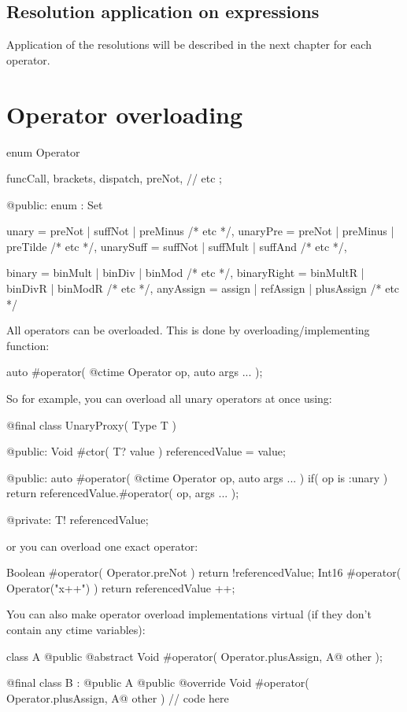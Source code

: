 \subsection{Resolution application on expressions}
Application of the resolutions will be described in the next chapter for each operator.

\section{Operator overloading}
\begin{code}
enum Operator {
	funcCall,
	brackets,
	dispatch,
	preNot,
	// etc
	;
	
@public:
	enum : Set {
		unary = preNot | suffNot | preMinus /* etc */,
		unaryPre = preNot | preMinus | preTilde /* etc */,
		unarySuff = suffNot | suffMult | suffAnd /* etc */,
		
		binary = binMult | binDiv | binMod /* etc */,
		binaryRight = binMultR | binDivR | binModR /* etc */,
		anyAssign = assign | refAssign | plusAssign /* etc */
	}	
}
\end{code}

All operators can be overloaded. This is done by overloading/implementing function:
\begin{code}
auto #operator( @ctime Operator op, auto args ... );
\end{code}

So for example, you can overload all unary operators at once using:
\begin{code}
@final class UnaryProxy( Type T ) {
	
@public:
	Void #ctor( T? value ) {
		referencedValue = value;
	}
	
@public:
	auto #operator( @ctime Operator op, auto args ... )
		if( op is :unary )
	{
		return referencedValue.#operator( op, args ... );
	}
	
@private:
	T! referencedValue;
	
}
\end{code}

or you can overload one exact operator:
\begin{code}
Boolean #operator( Operator.preNot ) {
	return !referencedValue;	
}
Int16 #operator( Operator("x++") ) {
	return referencedValue ++;
}
\end{code}

You can also make operator overload implementations virtual (if they don't contain any ctime variables):
\begin{code}
class A {
	@public @abstract Void #operator( Operator.plusAssign, A@ other );
}

@final class B : @public A {
	@public @override Void #operator( Operator.plusAssign, A@ other ) {
		// code here	
	}
}
\end{code}


